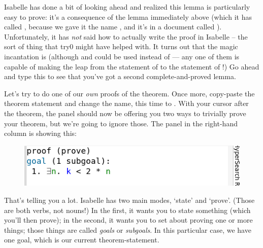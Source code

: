 Isabelle has done a bit of looking ahead and realized this lemma is particularly easy to prove: it's a consequence of the lemma immediately above (which it has called , because we gave it the name , and it's in a document called ). Unfortunately, it has \textit{not} said how to actually write the proof in Isabelle -- the sort of thing that try0 might have helped with. It turns out that the magic incantation is  (although  and  could be used instead of  --- any one of them is capable of making the leap from the statement of  to the statement of !) Go ahead and type this to see that you've got a second complete-and-proved lemma.
\etask 


Let's try to do one of our \textit{own} proofs of the theorem. Once more, copy-paste the theorem statement and change the name, this time to . With your cursor after the theorem, the  panel should now be offering you two ways to trivially prove your theorem, but we're going to ignore those. The  panel in the right-hand column is showing this:
\begin{figure}[h]
    \includegraphics[width=0.75\linewidth]{TEXT/C01/Images/state-panel.png}
\end{figure}

That's telling you a lot. Isabelle has two main modes, `state' and `prove'. (Those are both verbs, not nouns!) In the first, it wants you to state something (which you'll then prove); in the second, it wants you to set about proving one or more things; those things are called \textit{goals} or \textit{subgoals}. In this particular case, we have one goal, which is our current theorem-statement. 

